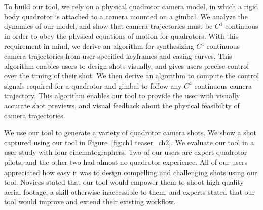 To build our tool, we rely on a physical quadrotor camera model, in which a rigid body quadrotor is attached to a camera mounted on a gimbal.
We analyze the dynamics of our model, and show that camera trajectories must be $C^4$ continuous in order to obey the physical equations of motion for quadrotors.
With this requirement in mind, we derive an algorithm for synthesizing $C^4$ continuous camera trajectories from user-specified keyframes and easing curves.
This algorithm enables users to design shots visually, and gives users precise control over the timing of their shot.
We then derive an algorithm to compute the control signals required for a quadrotor and gimbal to follow any $C^4$ continuous camera trajectory.
This algorithm enables our tool to provide the user with visually accurate shot previews, and visual feedback about the physical feasibility of camera trajectories.


We use our tool to generate a variety of quadrotor camera shots. We show a shot captured using our tool in Figure~\ref{fig:ch1:teaser_ch2}.
We evaluate our tool in a user study with four cinematographers.
Two of our users are expert quadrotor pilots, and the other two had almost no quadrotor experience. All of our users appreciated how easy it was to design compelling and challenging shots using our tool.
Novices stated that our tool would empower them to shoot high-quality aerial footage, a skill otherwise inaccessible to them, and experts stated that our tool would improve and extend their existing workflow.
